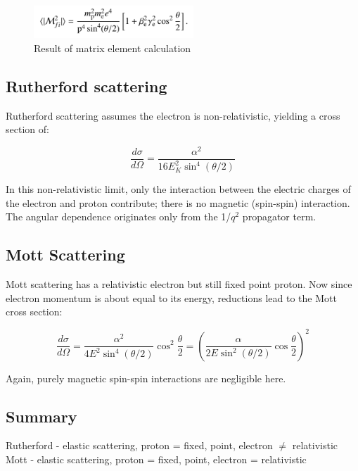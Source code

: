         \begin{figure}[H]
            \centering
            \includegraphics[width=6cm]{NuclearPhysics/modules/lepton-scattering/pics/elastic-ep/full-matrix.PNG}
            \caption{Result of matrix element calculation}
        \end{figure}
        
        \subsection{Rutherford scattering}
            \indent Rutherford scattering assumes the electron is non-relativistic, yielding a cross section of:

                \begin{equation}
                    \frac{d\sigma}{d\Omega} = \frac{\alpha^2}{16E^2_K\sin^4{(\theta/2)}}
                \end{equation}
            
            In this non-relativistic limit, only the interaction between the electric charges of the electron and proton contribute; there is no magnetic (spin-spin) interaction. The angular dependence originates only from the 1/$q^2$ propagator term.
            
        \subsection{Mott Scattering}
            \indent Mott scattering has a relativistic electron but still fixed point proton. Now since electron momentum is about equal to its energy, reductions lead to the Mott cross section:
            
                \begin{equation}
                    \frac{d\sigma}{d\Omega} = \frac{\alpha^2}{4E^2\sin^4{(\theta/2)}}\cos^2{\frac{\theta}{2}} = \left( \frac{\alpha}{2E\sin^2{(\theta/2)}}\cos{\frac{\theta}{2}} \right)^2
                \end{equation}
            
            Again, purely magnetic spin-spin interactions are negligible here. 
            
        \subsection{Summary}
            Rutherford - elastic scattering, proton = fixed, point, electron $\neq$ relativistic\\
            Mott - elastic scattering, proton = fixed, point, electron = relativistic
        
